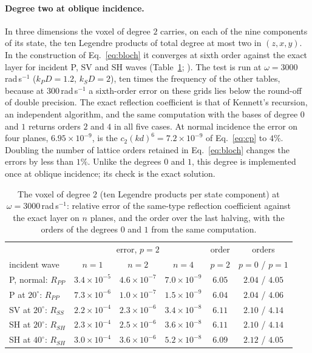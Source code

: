 \documentclass[11pt,a4paper]{article}
\begin{document}
\paragraph{Degree two at oblique incidence.} In three dimensions the voxel of degree $2$ carries, on each
of the nine components of its state, the ten Legendre products of total degree at most two in
$(z,x,y)$. In the construction of Eq.~\eqref{eq:bloch} it converges at sixth order against the exact
layer for incident P, SV and SH waves (Table~\ref{tab:deg2}; ).
The test is run at $\omega=3000$\,rad\,s$^{-1}$ ($k_PD=1.2$, $k_SD=2$), ten times the frequency of the
other tables, because at $300$\,rad\,s$^{-1}$ a sixth-order error on these grids lies below the round-off
of double precision. The exact reflection coefficient is that of Kennett's recursion, an independent
algorithm, and the same computation with the bases of degree $0$ and $1$ returns orders $2$ and $4$ in
all five cases. At normal incidence the error on four planes, $6.95\times10^{-9}$, is the
$c_2(kd)^6=7.2\times10^{-9}$ of Eq.~\eqref{eq:cp} to $4\%$. Doubling the number of lattice orders retained
in Eq.~\eqref{eq:bloch} changes the errors by less than $1\%$. Unlike the degrees $0$ and $1$, this degree
is implemented once at oblique incidence; its check is the exact solution.
\begin{table}[htbp]
\centering
\caption{The voxel of degree $2$ (ten Legendre products per state component) at
$\omega=3000$\,rad\,s$^{-1}$: relative error of the same-type reflection coefficient against the exact
layer on $n$ planes, and the order over the last halving, with the orders of the degrees $0$ and $1$ from
the same computation.}\label{tab:deg2}
\small
\begin{tabular}{@{}lccccc@{}}
\toprule
 & \multicolumn{3}{c}{error, $p=2$} & order & orders \\
incident wave & $n=1$ & $n=2$ & $n=4$ & $p=2$ & $p=0$ / $p=1$ \\
\midrule
P, normal: $R_{PP}$ & $3.4\times10^{-5}$ & $4.6\times10^{-7}$ & $7.0\times10^{-9}$ & $6.05$ & $2.04$ / $4.05$ \\
P at $20^\circ$: $R_{PP}$ & $7.3\times10^{-6}$ & $1.0\times10^{-7}$ & $1.5\times10^{-9}$ & $6.04$ & $2.04$ / $4.06$ \\
SV at $20^\circ$: $R_{SS}$ & $2.2\times10^{-4}$ & $2.3\times10^{-6}$ & $3.4\times10^{-8}$ & $6.11$ & $2.10$ / $4.14$ \\
SH at $20^\circ$: $R_{SH}$ & $2.3\times10^{-4}$ & $2.5\times10^{-6}$ & $3.6\times10^{-8}$ & $6.11$ & $2.10$ / $4.14$ \\
SH at $40^\circ$: $R_{SH}$ & $3.0\times10^{-4}$ & $3.6\times10^{-6}$ & $5.2\times10^{-8}$ & $6.09$ & $2.12$ / $4.05$ \\
\bottomrule
\end{tabular}
\end{table}
\end{document}
